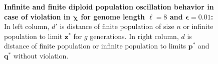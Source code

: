 \begin{figure}[h]
\begin{center}
\hspace{-3em}%
\vspace{-0.5em}  \hspace{-3em}%


\caption{\textbf{Infinite and finite diploid population oscillation behavior in case of violation in $\bm{\chi}$ for genome length $\ell = 8$ and $\bm{\epsilon} = 0.01$:} 
  In left column, $d'$ is distance of finite population of size $n$ or infinite population to limit $\bm{z}^\ast$ for $g$ generations. In right column, $d$ is distance of finite population or infinite population to limits $\bm{p}^\ast$ and $\bm{q}^\ast$ without violation.}
\label{oscillation_8d_vio_chi_0.01}
\end{center}
\end{figure}

